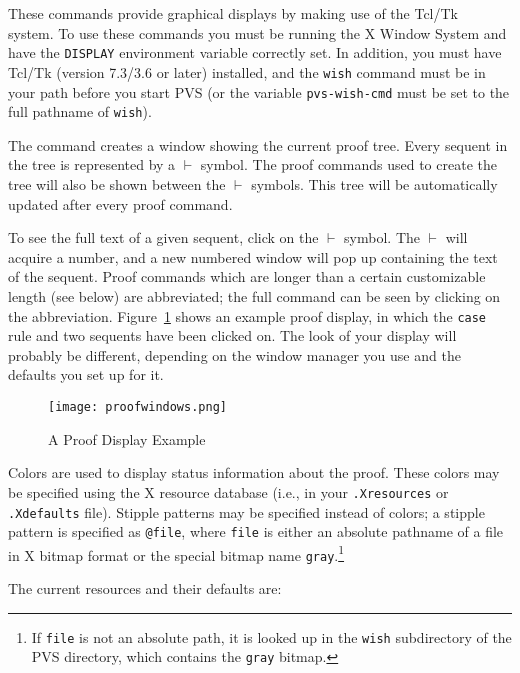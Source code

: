 These commands provide graphical displays by making use of the
Tcl/Tk~\cite{Tcl/TK} system.  To use these commands you must be running
the X Window System and have the
\texttt{DISPLAY} environment variable correctly set.
In addition, you must have Tcl/Tk (version 7.3/3.6 or later)
installed, and the \texttt{wish} command must be in your path before you
start PVS (or the variable \texttt{pvs-wish-cmd} must be set to the full
pathname of \texttt{wish}).  

The  command creates a window showing the
cur\-rent proof tree.  Every sequent in the tree is represented by a
$\vdash$ symbol.  The proof commands used to create
the tree will also be shown between the $\vdash$ symbols.  This tree will
be automatically updated after every proof command.

To see the full text of a given sequent, click on the $\vdash$ symbol.
The $\vdash$ will acquire a number, and a new numbered window will pop up
containing the text of the sequent.  Proof commands which are longer than
a certain customizable length (see below) are abbreviated; the full
command can be seen by clicking on the abbreviation.
Figure~\ref{proofwindow} shows an example proof display, in which the
\texttt{case} rule and two sequents have been clicked on.  The look of
your display will probably be different, depending on the window manager
you use and the defaults you set up for it.

\begin{figure}
\texttt{[image: proofwindows.png]}  
\caption{A Proof Display Example}\label{proofwindow}
\end{figure}

Colors are used to display status information about the proof.  These
colors may be specified using the X resource database (i.e., in your
\texttt{.Xresources} or \texttt{.Xdefaults} file).  Stipple patterns may
be specified instead of colors; a stipple pattern is specified as
\texttt{@file}, where \texttt{file} is either an absolute pathname of a
file in X bitmap format or the special bitmap name
\texttt{gray}.\footnote{If \texttt{file} is not an absolute path, it is
looked up in the \texttt{wish} subdirectory of the PVS directory, which
contains the \texttt{gray} bitmap.}

The current resources and their defaults are:

